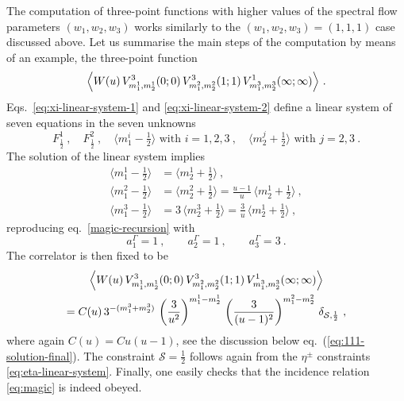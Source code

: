 \documentclass[a4paper,11pt]{article}
\numberwithin{equation}{section}
\def\be{\begin{equation}}
\def\ee{\end{equation}}
\begin{document}
The computation of three-point functions with higher values of the spectral flow parameters $(w_1, w_2, w_3)$ works similarly to the $(w_1, w_2, w_3)=(1,1,1)$ case discussed above.  Let us summarise the main steps of the computation by means of an example, the three-point function 
\begin{equation}
\Bigl\langle W(u) \, V^3_{m_1^1,m_2^1}(0;0) \, V^3_{m_1^2,m_2^2}(1;1) \,  V^1_{m_1^3,m_2^3}(\infty;\infty) \Bigr\rangle\ .
\end{equation}
Eqs.~\eqref{eq:xi-linear-system-1} and \eqref{eq:xi-linear-system-2} define a linear system of seven equations in the seven unknowns 
\be
F^1_{\frac{1}{2}} \ , \quad F^2_{\frac{1}{2}} \ , \quad \bigl\langle m_1^i-\tfrac{1}{2}\bigr\rangle \text{ with } i=1,2,3 \ , \quad \bigl\langle m_2^j+\tfrac{1}{2}\bigr\rangle \text{ with } j=2,3 \ . 
\ee 
The solution of the linear system implies
\begin{subequations}
\begin{align}
\bigl\langle m_1^1-\tfrac{1}{2}\bigr\rangle & = \bigl\langle m_2^1+\tfrac{1}{2}\bigr\rangle \ , \\
\bigl\langle m_1^2-\tfrac{1}{2}\bigr\rangle & = \bigl\langle m_2^2+\tfrac{1}{2}\bigr\rangle = \frac{u-1}{u} \, \bigl\langle m_2^1+\tfrac{1}{2}\bigr\rangle \ , \\
\bigl\langle m_1^3-\tfrac{1}{2}\bigr\rangle & = 3 \,  \bigl\langle m_2^3+\tfrac{1}{2}\bigr\rangle=\frac{3}{u} \, \bigl\langle m_2^1+\tfrac{1}{2}\bigr\rangle \ ,  
\end{align}
\end{subequations}
reproducing eq.~\eqref{magic-recursion} with 
\be 
a_1^\Gamma = 1 \ , \qquad a_2^\Gamma = 1 \ , \qquad a_3^\Gamma = 3 \ . 
\ee
The correlator is then fixed to be 
\begin{multline}
\Bigl\langle W(u) \, V^3_{m_1^1,m_2^1}(0;0) \, V^3_{m_1^2,m_2^2}(1;1) \,  V^1_{m_1^3,m_2^3}(\infty;\infty) \Bigr\rangle \\
= C(u) \, 3^{-(m_1^3+m_2^3)} \, \left(\frac{3}{u^2} \right)^{m_1^1-m_2^1} \, \left( \frac{3}{(u-1)^2} \right)^{m_1^2-m_2^2} \, \delta_{\mathcal S,\frac{1}{2}} \ ,  
\label{eq:explicit-correlator-331}
\end{multline}
where again $C(u) = C u (u-1)$, see the discussion below eq.~(\ref{eq:111-solution-final}). The constraint $\mathcal{S}=\frac{1}{2}$ follows again from the $\eta^\pm$ constraints \eqref{eq:eta-linear-system}. Finally, one easily checks that the incidence relation \eqref{eq:magic} is indeed obeyed. 
\end{document}
